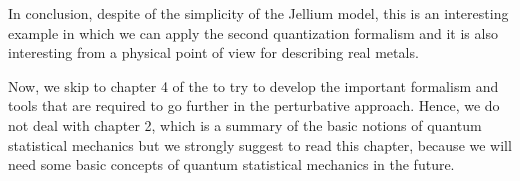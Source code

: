\documentclass[../main/main.tex]{subfiles}
\begin{document}
In conclusion, despite of the simplicity of the Jellium model, this is an interesting example in which we can apply the second quantization formalism and it is also interesting from a physical point of view for describing real metals.

Now, we skip to chapter 4 of the \cite{fetter} to try to develop the important formalism and tools that are required to go further in the perturbative approach. Hence, we do not deal with chapter 2, which is a summary of the basic notions of quantum statistical mechanics but we strongly suggest to read this chapter, because we will need some basic concepts of quantum statistical mechanics in the future.
\end{document}
